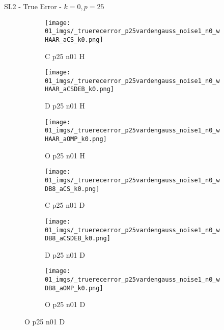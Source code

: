 \begin{frame}{SL2 - True Error - $k=0,p=25$}{}
\begin{figure}
\begin{subfigure}{0.13\textwidth}
\texttt{[image: 01\_imgs/\_truerecerror\_p25vardengauss\_noise1\_n0\_wHAAR\_aCS\_k0.png]}
\caption*{\tiny C p25 n01 H}
\end{subfigure}
\begin{subfigure}{0.13\textwidth}
\texttt{[image: 01\_imgs/\_truerecerror\_p25vardengauss\_noise1\_n0\_wHAAR\_aCSDEB\_k0.png]}
\caption*{\tiny D p25 n01 H}
\end{subfigure}
\begin{subfigure}{0.13\textwidth}
\texttt{[image: 01\_imgs/\_truerecerror\_p25vardengauss\_noise1\_n0\_wHAAR\_aOMP\_k0.png]}
\caption*{\tiny O p25 n01 H}
\end{subfigure}
\begin{subfigure}{0.13\textwidth}
\texttt{[image: 01\_imgs/\_truerecerror\_p25vardengauss\_noise1\_n0\_wDB8\_aCS\_k0.png]}
\caption*{\tiny C p25 n01 D}
\end{subfigure}
\begin{subfigure}{0.13\textwidth}
\texttt{[image: 01\_imgs/\_truerecerror\_p25vardengauss\_noise1\_n0\_wDB8\_aCSDEB\_k0.png]}
\caption*{\tiny D p25 n01 D}
\end{subfigure}
\begin{subfigure}{0.13\textwidth}
\texttt{[image: 01\_imgs/\_truerecerror\_p25vardengauss\_noise1\_n0\_wDB8\_aOMP\_k0.png]}
\caption*{\tiny O p25 n01 D}
\end{subfigure}

\vspace{5pt}


\end{figure}
\end{frame}
